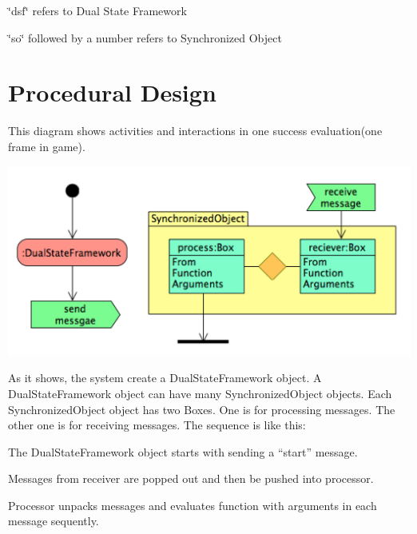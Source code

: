 \begin{DoxyItemize}
\item \char`\"{}dsf\char`\"{} refers to Dual State Framework
\item \char`\"{}so\char`\"{} followed by a number refers to Synchronized Object
\end{DoxyItemize}\hypertarget{_framework_design_FrameworkDesignProceduralDesign}{}\section{Procedural Design}\label{_framework_design_FrameworkDesignProceduralDesign}
This diagram shows activities and interactions in one success evaluation(one frame in game). 
\begin{DoxyImageNoCaption}
  \mbox{\includegraphics[width=\textwidth,height=\textheight/2,keepaspectratio=true]{DesignProcedure.png}}
\end{DoxyImageNoCaption}
 As it shows, the system create a Dual\+State\+Framework object. A Dual\+State\+Framework object can have many Synchronized\+Object objects. Each Synchronized\+Object object has two Boxes. One is for processing messages. The other one is for receiving messages. The sequence is like this\+:
\begin{DoxyEnumerate}
\item The Dual\+State\+Framework object starts with sending a “start” message.
\item Messages from receiver are popped out and then be pushed into processor.
\item Processor unpacks messages and evaluates function with arguments in each message sequently.
\end{DoxyEnumerate}


